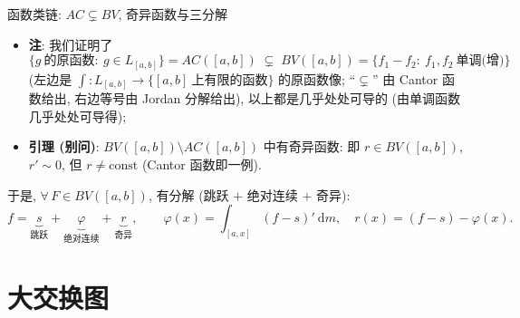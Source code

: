 
\begin{frame}{函数类链: $AC \subsetneq BV$, 奇异函数与三分解}

\begin{itemize}
\item \textbf{注}: 我们证明了
\[
\{ g\ \text{的原函数}:\ g \in L_{[a, b]} \} = AC([a, b])
\;\subsetneq\;
BV([a, b]) = \{ f_1 - f_2:\ f_1, f_2\ \text{单调(增)} \}
\]
(左边是 $\int: L_{[a, b]} \to \{[a, b]\ \text{上有限的函数}\}$ 的原函数像;
``$\subsetneq$'' 由 Cantor 函数给出, 右边等号由 Jordan 分解给出),
以上都是几乎处处可导的 (由单调函数几乎处处可导得);
\item \textbf{引理 (别问)}: $BV([a, b]) \setminus AC([a, b])$ 中有\alert{奇异函数}:
即 $r \in BV([a, b])$, $r' \sim 0$, 但 $r \neq \mathrm{const}$ (Cantor 函数即一例).
\end{itemize}

\pause

于是, $\forall\, F \in BV([a, b])$, 有分解 (跳跃 $+$ 绝对连续 $+$ 奇异):
\[
f = \underbrace{s}_{\text{跳跃}} + \underbrace{\varphi}_{\text{绝对连续}} + \underbrace{r}_{\text{奇异}} ,
\qquad
\varphi(x) = \int_{[a, x]} (f - s)' ~ \mathrm{d} m,
\quad
r(x) = (f - s) - \varphi(x) .
\]

\end{frame}


\section[交换图]{大交换图}



